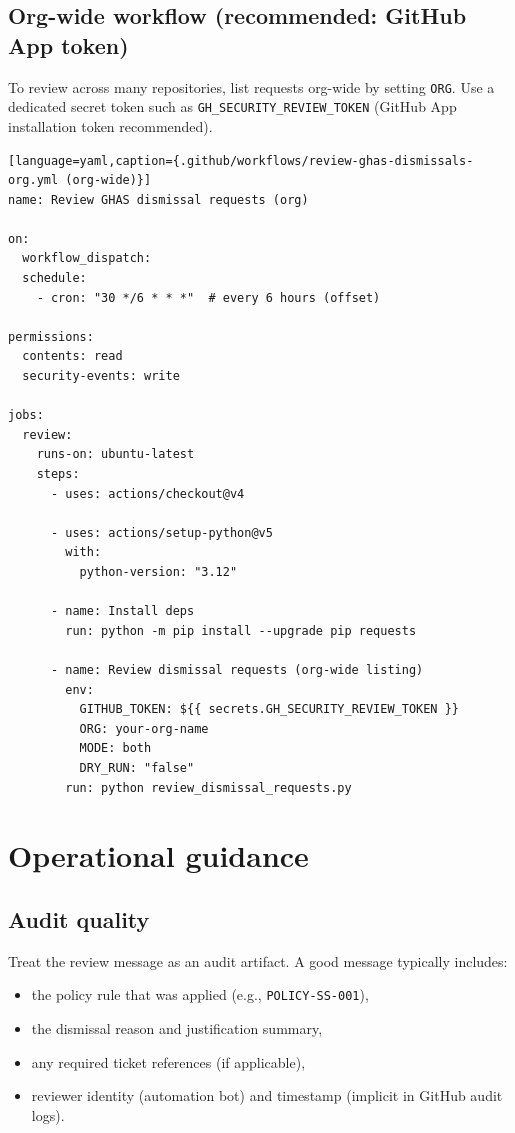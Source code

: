 \documentclass[11pt]{article}
\begin{document}
\subsection{Org-wide workflow (recommended: GitHub App token)}

To review across many repositories, list requests org-wide by setting \texttt{ORG}. Use a dedicated secret token such as \texttt{GH\_SECURITY\_REVIEW\_TOKEN} (GitHub App installation token recommended).

\begin{verbatim}[language=yaml,caption={.github/workflows/review-ghas-dismissals-org.yml (org-wide)}]
name: Review GHAS dismissal requests (org)

on:
  workflow_dispatch:
  schedule:
    - cron: "30 */6 * * *"  # every 6 hours (offset)

permissions:
  contents: read
  security-events: write

jobs:
  review:
    runs-on: ubuntu-latest
    steps:
      - uses: actions/checkout@v4

      - uses: actions/setup-python@v5
        with:
          python-version: "3.12"

      - name: Install deps
        run: python -m pip install --upgrade pip requests

      - name: Review dismissal requests (org-wide listing)
        env:
          GITHUB_TOKEN: ${{ secrets.GH_SECURITY_REVIEW_TOKEN }}
          ORG: your-org-name
          MODE: both
          DRY_RUN: "false"
        run: python review_dismissal_requests.py
\end{verbatim}

\section{Operational guidance}

\subsection{Audit quality}

Treat the review message as an audit artifact. A good message typically includes:
\begin{itemize}
  \item the policy rule that was applied (e.g., \texttt{POLICY-SS-001}),
  \item the dismissal reason and justification summary,
  \item any required ticket references (if applicable),
  \item reviewer identity (automation bot) and timestamp (implicit in GitHub audit logs).
\end{itemize}
\end{document}
